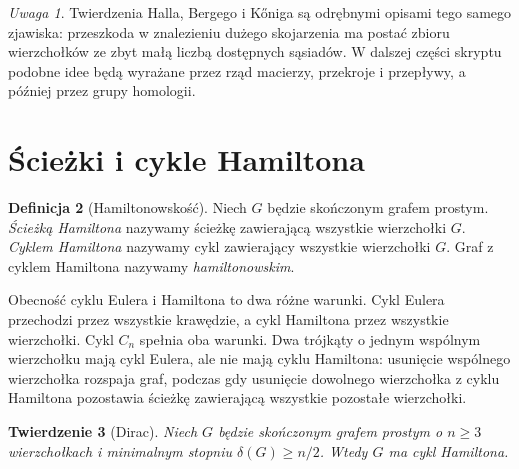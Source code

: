 \documentclass[11pt,a4paper]{report}
\numberwithin{equation}{section}
\theoremstyle{plain}
\newtheorem{twierdzenie}{Twierdzenie}[section]
\theoremstyle{definition}
\newtheorem{definicja}[twierdzenie]{Definicja}
\theoremstyle{remark}
\newtheorem{uwaga}[twierdzenie]{Uwaga}
\begin{document}
\begin{uwaga}
Twierdzenia Halla, Bergego i Kőniga są odrębnymi opisami
tego samego zjawiska: przeszkoda w znalezieniu dużego
skojarzenia ma postać zbioru wierzchołków ze zbyt małą
liczbą dostępnych sąsiadów. W dalszej części skryptu
podobne idee będą wyrażane przez rząd macierzy,
przekroje i przepływy, a później przez grupy homologii.
\end{uwaga}

\section{Ścieżki i cykle Hamiltona}
\label{sec:tg-hamilton}

\begin{definicja}[Hamiltonowskość]
Niech $G$ będzie skończonym grafem prostym.
\emph{Ścieżką Hamiltona} nazywamy ścieżkę zawierającą
wszystkie wierzchołki $G$. \emph{Cyklem Hamiltona}
nazywamy cykl zawierający wszystkie wierzchołki $G$.
Graf z cyklem Hamiltona nazywamy \emph{hamiltonowskim}.
\end{definicja}

Obecność cyklu Eulera i Hamiltona to dwa różne warunki.
Cykl Eulera przechodzi przez wszystkie krawędzie,
a cykl Hamiltona przez wszystkie wierzchołki.
Cykl $C_n$ spełnia oba warunki. Dwa trójkąty o jednym
wspólnym wierzchołku mają cykl Eulera, ale nie mają
cyklu Hamiltona: usunięcie wspólnego wierzchołka
rozspaja graf, podczas gdy usunięcie dowolnego
wierzchołka z cyklu Hamiltona pozostawia ścieżkę
zawierającą wszystkie pozostałe wierzchołki.

\begin{center}
\end{center}

\begin{twierdzenie}[Dirac]
\label{thm:tg-dirac}
Niech $G$ będzie skończonym grafem prostym o
$n\ge3$ wierzchołkach i minimalnym stopniu
$\delta(G)\ge n/2$. Wtedy $G$ ma cykl Hamiltona.
\end{twierdzenie}
\end{document}
